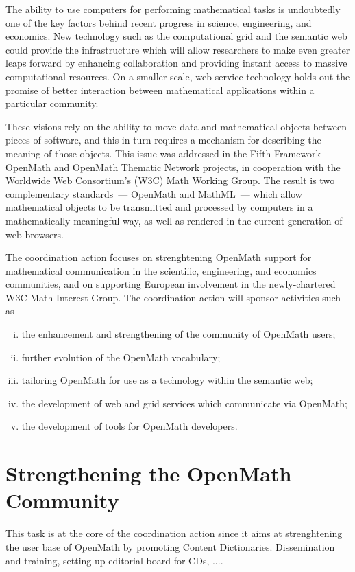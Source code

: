 \documentclass[draft]{artikel3}
\begin{document}
The ability to use computers for performing mathematical tasks is
undoubtedly one of the key factors behind recent progress in science,
engineering, and economics.  New technology such as the computational
grid and the semantic web could provide the infrastructure which will
allow researchers to make even greater leaps forward by enhancing
collaboration and providing instant access to massive computational
resources.  On a smaller scale, web service technology holds out the
promise of better interaction between mathematical applications within
a particular community.

These visions rely on the ability to move data and mathematical
objects between pieces of software, and this in turn requires a
mechanism for describing the meaning of those objects.  This issue was
addressed in the Fifth Framework OpenMath and OpenMath Thematic
Network projects, in cooperation with the Worldwide Web Consortium's
(W3C) Math Working Group.  The result is two complementary
standards~--- OpenMath and MathML~--- which allow mathematical objects
to be transmitted and processed by computers in a mathematically
meaningful way, as well as rendered in the current generation of web
browsers.

The coordination action focuses on strenghtening OpenMath support for
mathematical communication in the scientific, engineering, and
economics communities, and on supporting European involvement in the
newly-chartered W3C Math Interest Group.  The coordination action will
sponsor activities such as

\begin{enumerate}[(i)]
\item the enhancement and strengthening of the community of OpenMath
  users;
\item further evolution of the OpenMath vocabulary;
\item tailoring OpenMath for use as a technology within the semantic
  web;
\item the development of web and grid services which communicate via
  OpenMath;
\item the development of tools for OpenMath developers.
\end{enumerate}


\section{Strengthening the OpenMath Community} 
\label{community}

This task is at the core of the coordination action since it aims at
strenghtening the user base of OpenMath by promoting Content
Dictionaries. Dissemination and training, setting up editorial board
for CDs, ....
\end{document}
